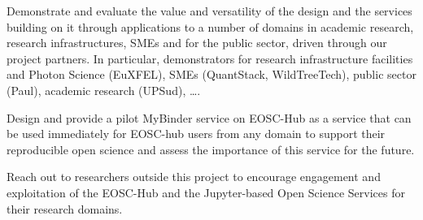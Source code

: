 \begin{compactenum}
\item \label{aim:demonstrators}%
  Demonstrate and evaluate the value and versatility of the design and
  the services building on it through applications to a number of
  domains in academic research, research infrastructures, SMEs and for
  the public sector, driven through our project partners. In
  particular, demonstrators for research infrastructure facilities and
  Photon Science (EuXFEL), SMEs (QuantStack, WildTreeTech), public
  sector (Paul), academic research (UPSud), \ldots.


\item \label{aim:binderservice}%
  Design and provide a pilot MyBinder service on EOSC-Hub as a service
  that can be used immediately for EOSC-hub users from any domain to
  support their reproducible open science and assess the importance of
  this service for the future.

\item \label{aim:outreach-and-engagement}%
  Reach out to researchers outside this project to encourage engagement
  and exploitation of the EOSC-Hub and the Jupyter-based Open Science
  Services for their research domains.


\end{compactenum}

